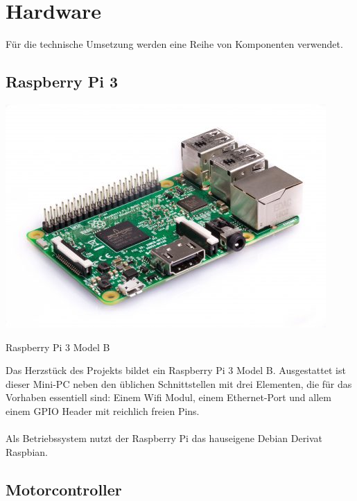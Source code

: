 \section{Hardware}
  Für die technische Umsetzung werden eine Reihe von Komponenten verwendet.

  \subsection{Raspberry Pi 3}
  
    \begin{minipage}{\columnwidth}
      \makeatletter
      \def\@captype{figure}
      \makeatother
      \centering
      \includegraphics[width=0.6\linewidth]{images/hw_raspberrypi3.jpg}
      \caption{Raspberry Pi 3 Model B}
      \label{fig:img-hw-01}
    \end{minipage}
    \vspace{1cm}

    \noindent
    Das Herzstück des Projekts bildet ein Raspberry Pi 3 Model B. Ausgestattet
    ist dieser Mini-PC neben den üblichen Schnittstellen mit drei Elementen, die
    für das Vorhaben essentiell sind: Einem Wifi Modul, einem Ethernet-Port und
    allem einem GPIO Header mit reichlich freien Pins.\\
    \ \\
    Als Betriebssystem nutzt der Raspberry Pi das hauseigene Debian Derivat
    Raspbian. \\

  \subsection{Motorcontroller}

